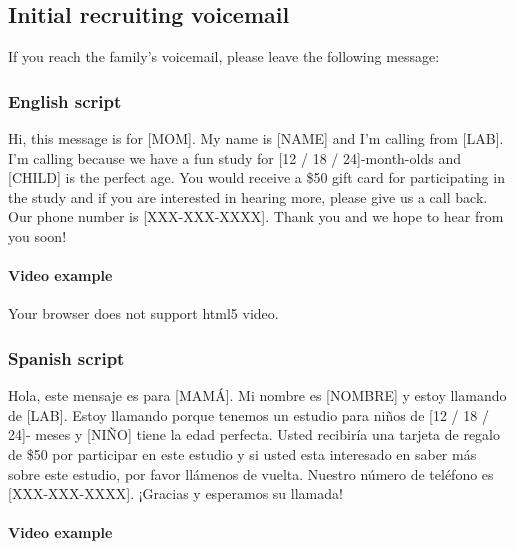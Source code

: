 \documentclass[
  12pt,
]{book}
\begin{document}
\hypertarget{initial-recruiting-voicemail}{%
\subsection*{Initial recruiting voicemail}\label{initial-recruiting-voicemail}}

If you reach the family's voicemail, please leave the following message:

\hypertarget{english-script}{%
\subsubsection*{English script}\label{english-script}}

Hi, this message is for {[}MOM{]}. My name is {[}NAME{]} and I'm calling from {[}LAB{]}. I'm calling because we have a fun study for {[}12 / 18 / 24{]}-month-olds and {[}CHILD{]} is the perfect age. You would receive a \$50 gift card for participating in the study and if you are interested in hearing more, please give us a call back. Our phone number is {[}XXX-XXX-XXXX{]}. Thank you and we hope to hear from you soon!

\hypertarget{voicemail_video}{%
\paragraph*{Video example}\label{voicemail_video}}

Your browser does not support html5 video.

\hypertarget{spanish-script}{%
\subsubsection*{Spanish script}\label{spanish-script}}

Hola, este mensaje es para {[}MAMÁ{]}. Mi nombre es {[}NOMBRE{]} y estoy llamando de {[}LAB{]}. Estoy llamando porque tenemos un estudio para niños de {[}12 / 18 / 24{]}- meses y {[}NIÑO{]} tiene la edad perfecta. Usted recibiría una tarjeta de regalo de \$50 por participar en este estudio y si usted esta interesado en saber más sobre este estudio, por favor llámenos de vuelta. Nuestro número de teléfono es {[}XXX-XXX-XXXX{]}. ¡Gracias y esperamos su llamada!

\hypertarget{voicemail_video_spanish}{%
\paragraph*{Video example}\label{voicemail_video_spanish}}
\end{document}
